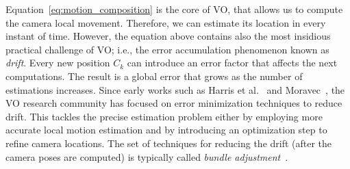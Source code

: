 Equation~\ref{eq:motion_composition} is the core of VO, that allows us to compute the camera local movement. Therefore, we can estimate its location in every instant of time. However, the equation above contains also the most insidious practical challenge of VO; i.e., the error accumulation phenomenon known as \emph{drift}.
Every new position $C_k$ can introduce an error factor that affects the next 
computations. The result is a global error that grows as the number of 
estimations increases.
%
Since early works such as Harris et al.~\cite{harris19883d} and Moravec~\cite{moravec1980obstacle}, the VO research community has focused on error minimization techniques to reduce drift.
This tackles the precise estimation problem either by employing more accurate
local motion estimation and by introducing an optimization step to refine 
camera locations.
The set of techniques for reducing the drift (after the camera poses are computed) is typically called \emph{bundle adjustment}~\cite{triggs1999bundle}.

